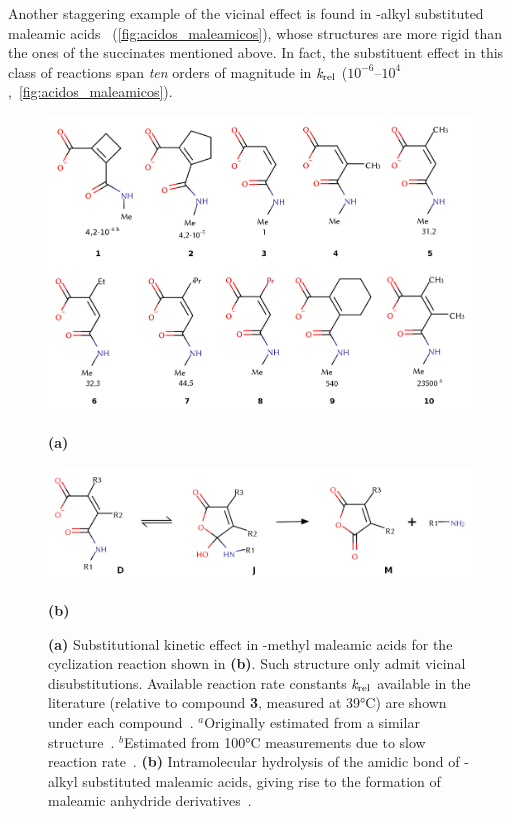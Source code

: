 Another staggering example of the vicinal effect is found in
\emph{}-alkyl substituted maleamic acids~\cite{Kirby_1972,Karaman_2011} (\autoref{fig:acidos_maleamicos}),
whose structures are more rigid than the ones of the
succinates mentioned above.
In fact, the substituent effect in this class of reactions span \emph{ten}
orders of magnitude in
$\emph{k}_\text{rel}$ ($10^{-6}$--$10^{4}$,~\autoref{fig:acidos_maleamicos}).
%
\begin{figure}[hbtp]
    \centering
    \includegraphics[width=.8\textwidth]{figures/acidos_maleamicos}

    \textbf{(a)}

    \includegraphics[width=.8\textwidth]{figures/acidos_maleamicos_reacao}

    \textbf{(b)}

    \caption[Intramolecular hydrolysis of the amidic bond in maleamic acids and
    their -methyl substitutional kinetic effect.]{
        \textbf{(a)}
        Substitutional kinetic effect in -methyl
        maleamic acids for the cyclization reaction shown in \textbf{(b)}.
        Such structure only admit vicinal disubstitutions.
        Available reaction rate constants $\emph{k}_\text{rel}$ available in
        the literature (relative to compound \textbf{3}, measured at 39°C)
        are shown under each compound~\cite{Kirby_1972}.
        $^a$Originally estimated from a similar structure~\cite{Kirby_1972}.
        $^b$Estimated from 100°C measurements due to slow reaction rate~\cite{Kirby_1972}.
        \textbf{(b)}
        Intramolecular hydrolysis of the amidic bond of \emph{}-alkyl
    substituted maleamic acids, giving rise to the formation of maleamic
anhydride derivatives~\cite{Kirby_1972,Jung_2005,Karaman_2011}.}%
    \label{fig:acidos_maleamicos_reacao}%
    \label{fig:acidos_maleamicos}
\end{figure}

